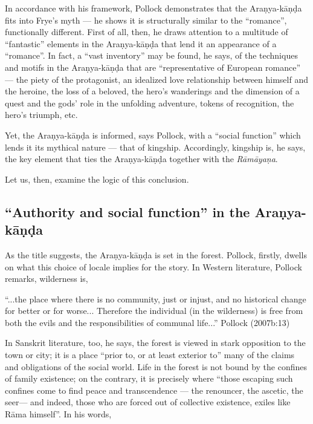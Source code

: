 In accordance with his framework, Pollock demonstrates that the Araṇya-kāṇḍa fits into Frye’s myth --- he shows it is structurally similar to the “romance”, functionally different. First of all, then, he draws attention to a multitude of “fantastic” elements in the Araṇya-kāṇḍa that lend it an appearance of a “romance”. In fact, a “vast inventory” may be found, he says, of the techniques and motifs in the Araṇya-kāṇḍa that are “representative of European romance” --- the piety of the protagonist, an idealized love relationship between himself and the heroine, the loss of a beloved, the hero’s wanderings and the dimension of a quest and the gods’ role in the unfolding adventure, tokens of recognition, the hero’s triumph, etc.  

Yet, the Araṇya-kāṇḍa is informed, says Pollock, with a “social function” which lends it its mythical nature --- that of kingship. Accordingly, kingship is, he says, the key element that ties the Araṇya-kāṇḍa together with the {\sl Rāmāyaṇa}. 

Let us, then, examine the logic of this conclusion. 

\subsection{“Authority and social function” in the Araṇya-kāṇḍa}\label{sec2.3.1}

As the title suggests, the Araṇya-kāṇḍa is set in the forest. Pollock, firstly, dwells on what this choice of locale implies for the story. In Western literature, Pollock remarks, wilderness is, 

\begin{myquote}
“...the place where there is no community, just or injust, and no historical change for better or for worse... Therefore the individual (in the wilderness) is free from both the evils and the responsibilities of communal life...”
\hfill Pollock (2007b:13)
\end{myquote}

In Sanskrit literature, too, he says, the forest is viewed in stark opposition to the town or city; it is a place “prior to, or at least exterior to” many of the claims and obligations of the social world. Life in the forest is not bound by the confines of family existence; on the contrary, it is precisely where “those escaping such confines come to find peace and transcendence --- the renouncer, the ascetic, the seer--- and indeed, those who are forced out of collective existence, exiles like Rāma himself”. In his words,

